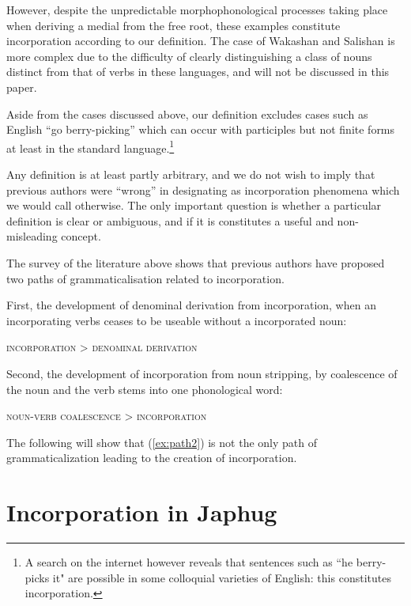 \documentclass[oldfontcommands,oneside,a4paper,11pt]{article}
\begin{document}
However, despite the unpredictable morphophonological processes taking place when deriving a medial from the free root, these examples constitute incorporation according to our definition. The case of Wakashan and Salishan is more complex due to the difficulty of clearly distinguishing a class of nouns distinct from that of verbs in these languages, and will not be discussed in this paper.


Aside from the cases discussed above, our definition excludes cases such as  English ``go berry-picking'' which can occur with participles but not finite forms at least in the standard language.\footnote{A search on the internet however reveals that sentences such as ``he berry-picks it" are possible in some colloquial varieties of English: this constitutes incorporation.} 
    
 Any definition is at least partly arbitrary, and we do not wish to imply that previous authors were ``wrong'' in designating as incorporation phenomena which we would call otherwise. The only important question is whether a particular definition is clear or ambiguous, and if it is constitutes a useful and non-misleading concept. 
 
 The survey of the literature above shows that previous authors have proposed two paths of grammaticalisation related to incorporation.
    
    First, the development of denominal derivation from incorporation, when an incorporating verbs ceases to be useable without a incorporated noun:
   \begin{exe}
\ex  \label{ex:path1}
 \glt  \textsc{incorporation}   > \textsc{denominal derivation}
\end{exe}   
      
Second, the     development of incorporation from noun stripping, by coalescence of the noun and the verb stems into one phonological word:
    
   \begin{exe}
\ex \label{ex:path2}
 \glt  \textsc{noun-verb coalescence}   > \textsc{incorporation}
\end{exe} 
  
The following will show that (\ref{ex:path2}) is not the only path of grammaticalization leading to the creation of incorporation.

\section{Incorporation in Japhug}
\end{document}
